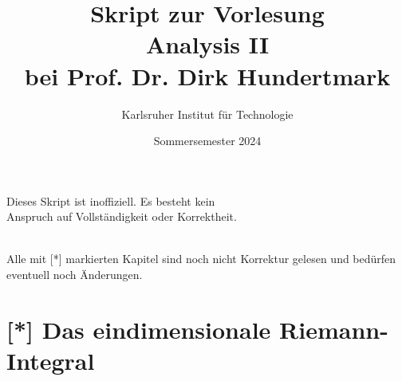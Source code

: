 \documentclass[11pt, twoside, a4paper]{article}
\theoremstyle{plain}
\begin{document}
    \title{\vspace{3cm} Skript zur Vorlesung\\Analysis II\\bei Prof. Dr. Dirk Hundertmark}
    \author{Karlsruher Institut für Technologie}
    \date{Sommersemester 2024}
    \maketitle
    \begin{center}
        Dieses Skript ist inoffiziell. Es besteht kein\\Anspruch auf Vollständigkeit oder Korrektheit.
    \end{center}
    \thispagestyle{empty}
    \newpage

    \tableofcontents
    ~\\
    Alle mit [*] markierten Kapitel sind noch nicht Korrektur gelesen und bedürfen eventuell noch Änderungen.

    \newpage


    \section{[*] Das eindimensionale Riemann-Integral}
\end{document}
